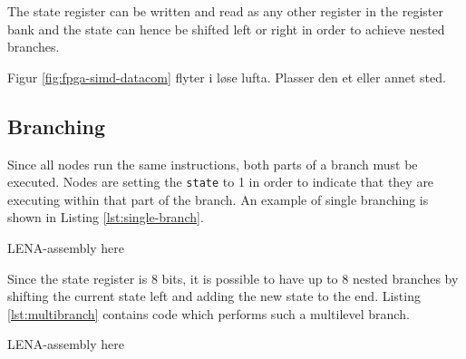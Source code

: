 The state register can be written and read as any other register in the register
bank and the state can hence be shifted left or right in order to achieve nested
branches.


{\sc \color{red} Figur \ref{fig:fpga-simd-datacom} flyter i løse lufta. Plasser
  den et eller annet sted.}

\subsection{Branching}
Since all nodes run the same instructions, both parts of a branch must be
executed. Nodes are setting the {\tt state} to 1 in order to indicate that they
are executing within that part of the branch. An example of single branching is
shown in Listing \ref{lst:single-branch}.

{\sc \color{red} LENA-assembly here}
%

Since the state register is 8 bits, it is possible to have up to 8 nested
branches by shifting the current state left and adding the new state to the
end. Listing \ref{lst:multibranch} contains code which performs such a
multilevel branch.

{\sc \color{red} LENA-assembly here}
%
